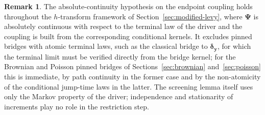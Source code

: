 \documentclass{article}
\theoremstyle{definition}
\newtheorem{remark}[proposition]{Remark}
\begin{document}
\begin{remark}
The absolute-continuity hypothesis on the endpoint coupling holds throughout the $h$-transform framework of Section~\ref{sec:modified-levy}, where $\boldsymbol{\Psi}$ is absolutely continuous with respect to the terminal law of the driver and the coupling is built from the corresponding conditional kernels. It excludes pinned bridges with atomic terminal laws, such as the classical bridge to $\boldsymbol{\delta}_{\boldsymbol{y}}$, for which the terminal limit must be verified directly from the bridge kernel; for the Brownian and Poisson pinned bridges of Sections~\ref{sec:brownian} and~\ref{sec:poisson} this is immediate, by path continuity in the former case and by the non-atomicity of the conditional jump-time laws in the latter. The screening lemma itself uses only the Markov property of the driver; independence and stationarity of increments play no role in the restriction step.
\end{remark}
\end{document}
